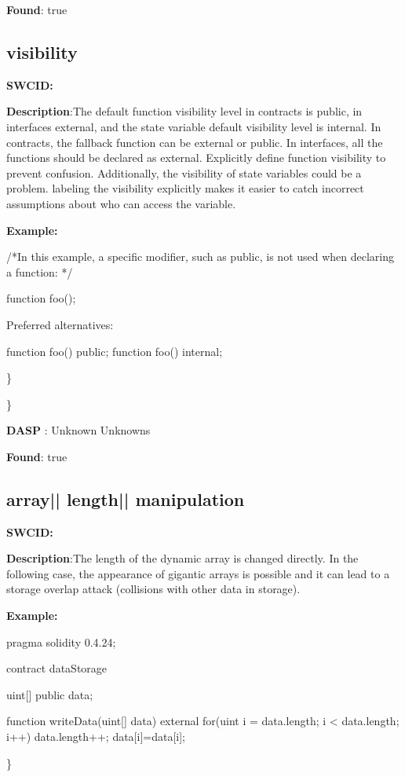 \documentclass{article}
\begin{document}
\textbf{Found}: true

\subsection{visibility} 
\textbf{SWC{\textunderscore }ID:} 

\textbf{Description}:The default function visibility level in contracts is public, in interfaces {\textendash} external,  and the state variable default visibility level is internal. In contracts, the fallback function can be external or public. In interfaces, all the functions should be declared as external. Explicitly define function visibility to prevent confusion.
Additionally, the visibility of state variables could be a problem. labeling the visibility explicitly makes it easier to catch incorrect assumptions about who can access the variable.


\textbf{Example:} 
\begin{ffcode} 

/*In this example, a specific modifier, such as public, is not used when declaring a function: */ 

function foo();

Preferred alternatives:

function foo() public;
function foo() internal;

\end{ffcode} 
\} 

\} 

\textbf{DASP} : Unknown Unknowns

\textbf{Found}: true

\subsection{array{|\textunderscore| }length{|\textunderscore| }manipulation} 
\textbf{SWC{\textunderscore }ID:} 

\textbf{Description}:The length of the dynamic array is changed directly. In the following case, the appearance of gigantic arrays is possible and it can lead to a storage overlap attack (collisions with other data in storage).


\textbf{Example:} 
\begin{ffcode} 

pragma solidity 0.4.24;

contract dataStorage {
    uint[] public data;

    function writeData(uint[] \textunderscore data) external {
        for(uint i = data.length; i < \textunderscore data.length; i++) {
            data.length++;
            data[i]=\textunderscore data[i];
        }
    }
}

\end{ffcode} 
\} 
\end{document}
